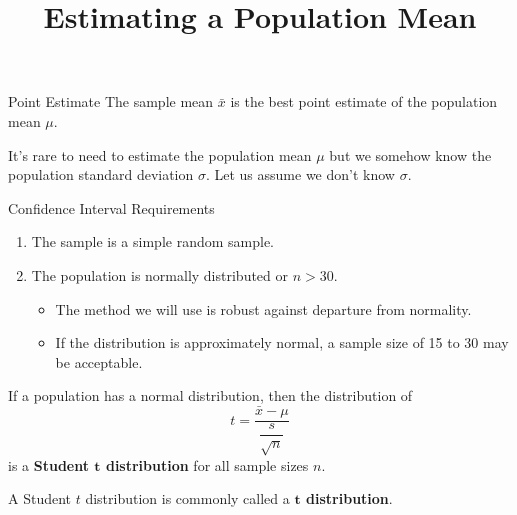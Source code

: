 \documentclass{beamer}
\title[MA205 - Section 7.2]{Estimating a Population Mean}
\begin{document}
\begin{frame}
\titlepage
\end{frame}

\begin{frame}
\begin{block}{Point Estimate}
The sample mean $\bar{x}$ is the best point estimate of the population mean $\mu$.
\end{block}\pause

\begin{note}
It's rare to need to estimate the population mean $\mu$ but we somehow know the population standard deviation $\sigma$. Let us assume we don't know $\sigma$.
\end{note}\pause

\begin{block}{Confidence Interval Requirements}
\begin{enumerate}
\item The sample is a simple random sample.\pause
\item The population is normally distributed or $n>30$.\pause
\begin{itemize}
\item The method we will use is robust against departure from normality.\pause
\item If the distribution is approximately normal, a sample size of 15 to 30 may be acceptable.
\end{itemize}
\end{enumerate}
\end{block}
\end{frame}

\begin{frame}
\begin{definition}
If a population has a normal distribution, then the distribution of 
\begin{equation*}
t = \dfrac{ \bar{x}-\mu }{ \dfrac{s}{ \sqrt{n} } }
\end{equation*}
is a \textbf{Student $\boldsymbol{t}$ distribution} for all sample sizes $n$.
\end{definition}\pause

\begin{note}
A Student $t$ distribution is commonly called a \textbf{$\boldsymbol{t}$ distribution}.
\end{note}
\end{frame}
\end{document}
